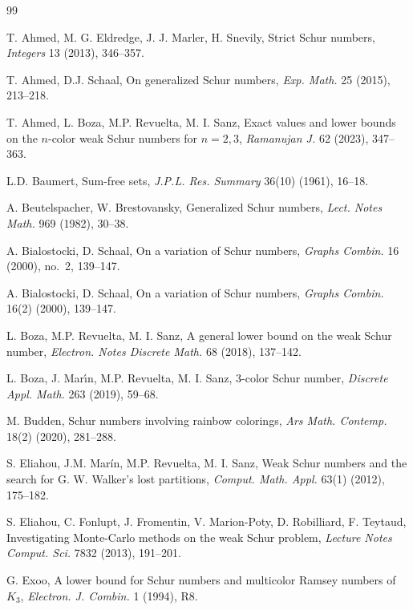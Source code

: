 \documentclass[twoside, 12pt]{article}
\begin{document}
\begin{thebibliography}{99}

T. Ahmed, M. G. Eldredge, J. J. Marler, H. Snevily, Strict Schur numbers, \emph{Integers} 13 (2013), 346--357.


T. Ahmed, D.J. Schaal, On generalized Schur numbers, \emph{Exp. Math.} 25 (2015), 213--218.

T. Ahmed, L. Boza, M.P. Revuelta, M. I. Sanz, Exact values and lower bounds on the $n$-color weak Schur numbers for $n=2,3$, \emph{Ramanujan J.} 62 (2023), 347--363.


L.D. Baumert, Sum-free sets, \emph{J.P.L. Res. Summary} 36(10) (1961), 16--18.


A. Beutelspacher, W. Brestovansky, Generalized Schur numbers, \emph{Lect. Notes Math.} 969 (1982), 30--38.

A. Bialostocki, D. Schaal, On a variation of Schur numbers, \emph{Graphs Combin.} 16 (2000), no.~2, 139--147.


A. Bialostocki, D. Schaal, On a variation of Schur numbers, \emph{Graphs Combin.} 16(2) (2000), 139--147.



L. Boza, M.P. Revuelta, M. I. Sanz, A general lower bound on the weak Schur number, \emph{Electron. Notes Discrete Math.} 68 (2018), 137--142.

L. Boza, J. Mar\'{\i}n, M.P. Revuelta, M. I. Sanz, 3-color Schur number, \emph{Discrete Appl. Math.} 263 (2019), 59--68.



M. Budden, Schur numbers involving rainbow colorings, \emph{Ars Math. Contemp.} 18(2) (2020), 281--288.

S. Eliahou, J.M. Mar\'{i}n, M.P. Revuelta, M. I. Sanz, Weak Schur numbers and the search for G. W. Walker's lost partitions, \emph{Comput. Math. Appl.} 63(1) (2012), 175--182.

S. Eliahou, C. Fonlupt, J. Fromentin, V. Marion-Poty, D. Robilliard, F. Teytaud, Investigating Monte-Carlo methods on the weak Schur problem, \emph{Lecture Notes Comput. Sci.} 7832 (2013), 191--201.

G. Exoo, A lower bound for Schur numbers and multicolor Ramsey numbers of $K_3$, \emph{Electron. J. Combin.} 1 (1994), R8.




\end{thebibliography}
\end{document}
